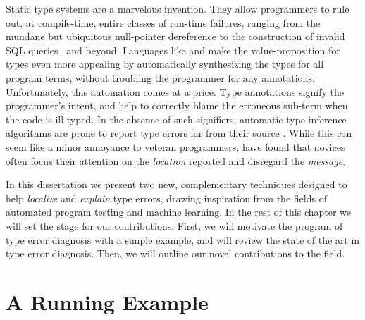 Static type systems are a marvelous invention.
%
They allow programmers to rule out, at compile-time, entire classes of
run-time failures, ranging from the mundane but ubiquitous null-pointer
dereference to the construction of invalid SQL
queries~\citep{Leijen1999-pd,Cook2005-tq} and beyond.
%
Languages like \ocaml and \haskell make
the value-proposition for types even more
appealing by automatically
synthesizing the types for all program terms,
without troubling the programmer for any
annotations.
%
Unfortunately, this automation comes at a price.
%
Type annotations signify the programmer's intent, and help to correctly
blame the erroneous sub-term when the code is ill-typed.
%
In the absence of such signifiers, automatic type inference algorithms
are prone to report type errors far from their source
\citep{Wand1986-nw}.
%
While this can seem like a minor annoyance to veteran programmers,
\citet{Joosten1993-yx} have found that novices often focus their
attention on the \emph{location} reported and disregard the
\emph{message}.

In this dissertation we present two new, complementary techniques
designed to help \emph{localize} and \emph{explain} type errors, drawing
inspiration from the fields of automated program testing and machine
learning.
%
In the rest of this chapter we will set the stage for our contributions.
%
First, we will motivate the program of type error diagnosis with a
simple example, and will review the state of the art in type error
diagnosis.
%
%
Then, we will outline our novel contributions to the field.


\section{A Running Example}
\label{sec:intro:sumList}

